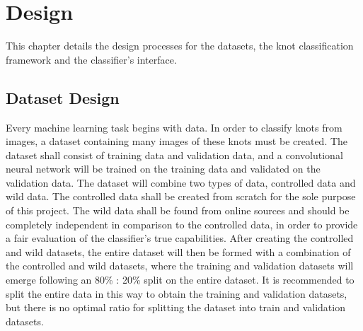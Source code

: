 \documentclass{l4proj}
\begin{document}


\chapter{Design}
This chapter details the design processes for the datasets, the knot classification framework and the classifier's interface.

\section{Dataset Design}
Every machine learning task begins with data.
In order to classify knots from images, a dataset containing many images of these knots must be created.
The dataset shall consist of training data and validation data, and a convolutional neural network will be trained on the training data and validated on the validation data.
The dataset will combine two types of data, controlled data and wild data.
The controlled data shall be created from scratch for the sole purpose of this project.
The wild data shall be found from online sources and should be completely independent in comparison to the controlled data, in order to provide a fair evaluation of the classifier's true capabilities.
After creating the controlled and wild datasets, the entire dataset will then be formed with a combination of the controlled and wild datasets, where the training and validation datasets will emerge following an 80\% : 20\% split on the entire dataset.
It is recommended to split the entire data in this way to obtain the training and validation datasets, but there is no optimal ratio for splitting the dataset into train and validation datasets.
\end{document}
